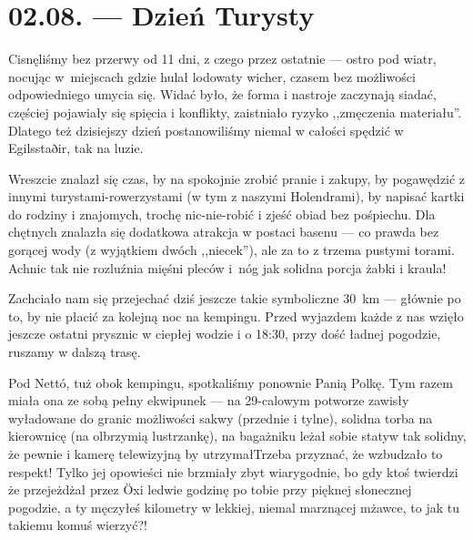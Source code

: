 \chapter*{02.08. --- Dzień Turysty}


Cisnęliśmy bez przerwy od 11 dni, z czego przez ostatnie --- ostro pod wiatr, nocując w~miejscach gdzie hulał lodowaty wicher, czasem bez możliwości odpowiedniego umycia się. Widać było, że forma i nastroje zaczynają siadać, częściej pojawiały się spięcia i konflikty, zaistniało ryzyko ,,zmęczenia materiału''. Dlatego też dzisiejszy dzień postanowiliśmy niemal w całości spędzić w Egilsstaðir, tak na luzie.

Wreszcie znalazł się czas, by na spokojnie zrobić pranie i zakupy, by pogawędzić z innymi turystami-rowerzystami (w tym z naszymi Holendrami), by napisać kartki do rodziny i znajomych, trochę nic-nie-robić i zjeść obiad bez pośpiechu. Dla chętnych znalazła się dodatkowa atrakcja w postaci basenu --- co prawda bez gorącej wody (z wyjątkiem dwóch ,,niecek''), ale za to z trzema pustymi torami. Ach\textellipsis nic tak nie rozluźnia mięśni pleców i~nóg jak solidna porcja żabki i kraula!


Zachciało nam się przejechać dziś jeszcze takie symboliczne 30~km --- głównie po to, by nie płacić za kolejną noc na kempingu. Przed wyjazdem każde z nas wzięło jeszcze ostatni prysznic w ciepłej wodzie i o 18:30, przy dość ładnej pogodzie, ruszamy w dalszą trasę.

Pod Nettó, tuż obok kempingu, spotkaliśmy ponownie Panią Polkę. Tym razem miała ona ze sobą pełny ekwipunek --- na 29-calowym potworze zawisły wyładowane do granic możliwości sakwy (przednie i tylne), solidna torba na kierownicę (na olbrzymią lustrzankę), na bagażniku leżał sobie statyw tak solidny, że pewnie i kamerę telewizyjną by utrzymał\textellipsis Trzeba przyznać, że wzbudzało to respekt! Tylko jej opowieści nie brzmiały zbyt wiarygodnie, bo gdy ktoś twierdzi że przejeżdżał przez Öxi ledwie godzinę po tobie przy pięknej słonecznej pogodzie, a ty męczyłeś kilometry w lekkiej, niemal marznącej mżawce, to jak tu takiemu komuś wierzyć?!

